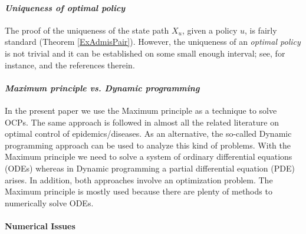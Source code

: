 \paragraph{\it Uniqueness of optimal policy}
The proof of the uniqueness of the state path $X_u$, given a policy $u$, is fairly standard (Theorem \ref{ExAdmisPair}). However, the uniqueness of an {\it optimal policy} is not trivial and it can be established on some small enough interval; see, for instance, \cite{GaffSchaefer09} and the references therein.   \medskip


\paragraph{\it Maximum principle vs. Dynamic programming} 
In the present paper we use the Maximum principle as a technique to solve OCPs. The same approach is followed in almost all the related literature on optimal control of epidemics/diseases. As an alternative, the so-called Dynamic programming approach can be used to analyze this kind of problems. With the Maximum principle we need to solve a system of ordinary differential equations (ODEs) whereas in Dynamic programming a partial differential equation (PDE) arises. In addition, both approaches involve an optimization problem. The Maximum principle is mostly used because there are plenty of methods to numerically solve ODEs.





\paragraph{Numerical Issues}